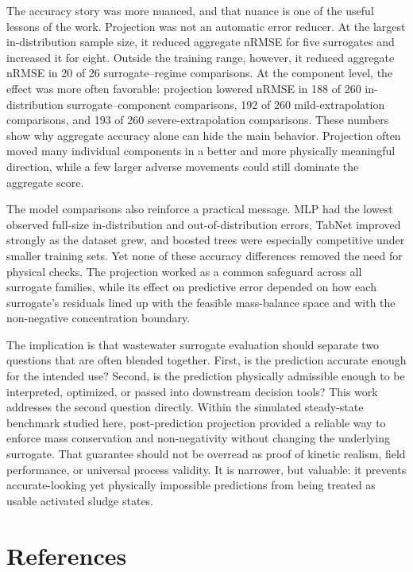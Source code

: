 \documentclass[a4paper,fleqn]{cas-sc}
\begin{document}
The accuracy story was more nuanced, and that nuance is one of the useful lessons of the work. Projection was not an automatic error reducer. At the largest in-distribution sample size, it reduced aggregate nRMSE for five surrogates and increased it for eight. Outside the training range, however, it reduced aggregate nRMSE in 20 of 26 surrogate--regime comparisons. At the component level, the effect was more often favorable: projection lowered nRMSE in 188 of 260 in-distribution surrogate--component comparisons, 192 of 260 mild-extrapolation comparisons, and 193 of 260 severe-extrapolation comparisons. These numbers show why aggregate accuracy alone can hide the main behavior. Projection often moved many individual components in a better and more physically meaningful direction, while a few larger adverse movements could still dominate the aggregate score.

The model comparisons also reinforce a practical message. MLP had the lowest observed full-size in-distribution and out-of-distribution errors, TabNet improved strongly as the dataset grew, and boosted trees were especially competitive under smaller training sets. Yet none of these accuracy differences removed the need for physical checks. The projection worked as a common safeguard across all surrogate families, while its effect on predictive error depended on how each surrogate's residuals lined up with the feasible mass-balance space and with the non-negative concentration boundary.

The implication is that wastewater surrogate evaluation should separate two questions that are often blended together. First, is the prediction accurate enough for the intended use? Second, is the prediction physically admissible enough to be interpreted, optimized, or passed into downstream decision tools? This work addresses the second question directly. Within the simulated steady-state benchmark studied here, post-prediction projection provided a reliable way to enforce mass conservation and non-negativity without changing the underlying surrogate. That guarantee should not be overread as proof of kinetic realism, field performance, or universal process validity. It is narrower, but valuable: it prevents accurate-looking yet physically impossible predictions from being treated as usable activated sludge states.

\section*{References}
\end{document}
